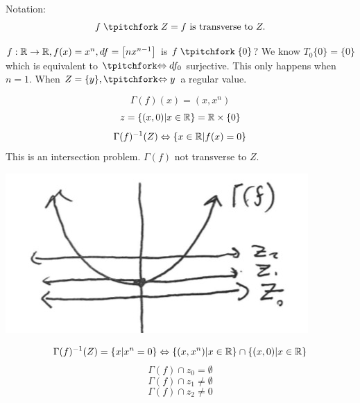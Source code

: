 \begin{definition}
  Notation:
    $$f \transv Z= f\text{ is transverse to } Z.$$
\end{definition}
\begin{example}
  $f: \mathbb{R} \to \mathbb{R}, f(x)=x^n, df =
\begin{bmatrix}
  nx^{n-1}
\end{bmatrix}
  $ is $f \transv \{0\}$? We know $T_0\{0\}=\{0\}$ which is equivalent to $\transv \Leftrightarrow df_0$ surjective. This only happens when $n=1$. When $Z=\{y\}, \transv \Leftrightarrow  y$ a regular value.
\end{example}
\begin{example}
  $$\Gamma(f)(x)=(x, x^n)$$
  $$z= \{(x,0)| x\in \mathbb{R}\}=\mathbb{R}\times \{0\}$$
  $$\Gamma(f)^{-1}(Z) \Leftrightarrow \{x\in \mathbb{R} | f(x)=0\}$$
  This is an intersection problem. $\Gamma(f)$ not transverse to $Z$.
  \begin{center}
  \includegraphics[width=0.30\paperwidth]{difftop/week06/gammaf}
  \end{center}
  $$\Gamma(f)^{-1}(Z)=\{x| x^n = 0\} \Leftrightarrow \{(x,x^n) | x\in \mathbb{R}\} \cap \{(x,0)| x\in \mathbb{R}\}$$
  $$\Gamma(f)\cap z_0= \emptyset$$
  $$\Gamma(f) \cap z_1\neq \emptyset$$
  $$\Gamma(f)\cap z_2 \neq 0$$

\end{example}

